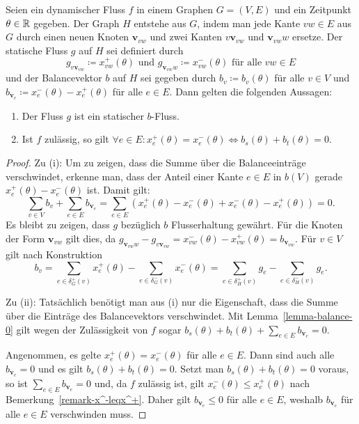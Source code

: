 \newcommand{\newv}{\mathbf{v}}
\begin{lemma}\label{lemma-b-graph}
	Seien ein dynamischer Fluss $f$ in einem Graphen $G=(V,E)$ und ein Zeitpunkt $\theta\in\mathbb{R}$ gegeben.
	Der Graph $H$ entstehe aus $G$, indem man jede Kante $vw\in E$ aus $G$ durch einen neuen Knoten $\newv_{vw}$ und zwei Kanten $v\newv_{vw}$ und $\newv_{vw}w$ ersetze.
	Der statische Fluss $g$ auf $H$ sei definiert durch
	\[ g_{v\newv_{vw}} \coloneq x_{vw}^+(\theta) \text{ und } g_{\newv_{vw}w} \coloneq x_{vw}^-(\theta) \text{ für alle $vw\in E$} \]
	und der Balancevektor $b$ auf $H$ sei gegeben durch $b_v\coloneq b_v(\theta)$ für alle $v\in V$ und $b_{\newv_e}\coloneq x_e^-(\theta) - x_e^+(\theta)$ für alle $e\in E$.
	Dann gelten die folgenden Aussagen:
	
	\begin{enumerate}[label=(\roman*)]
		\item Der Fluss $g$ ist ein statischer $b$-Fluss.
		\item\label{lemma-b-graph-imp} Ist $f$ zulässig, so gilt $\forall e\in E : x_e^+(\theta) = x_e^-(\theta)\iff b_s(\theta) + b_t(\theta) = 0$.
	\end{enumerate}
\end{lemma} 
\begin{proof}
	Zu (i): Um zu zeigen, dass die Summe über die Balanceeinträge verschwindet, erkenne man, dass der Anteil einer Kante $e\in E$ in $b(V)$ gerade $x_e^+(\theta) - x_e^-(\theta)$ ist.
	Damit gilt:
		\[ \sum_{v\in V}b_v + \sum_{e\in E} b_{\newv_e} = \sum_{e\in E} (x_e^+(\theta) - x_e^-(\theta) + x_e^-(\theta) - x_e^+(\theta)) = 0. \]
		Es bleibt zu zeigen, dass $g$ bezüglich $b$ Flusserhaltung gewährt.
		Für die Knoten der Form $\newv_{vw}$ gilt dies, da $g_{\newv_{vw}w} - g_{v\newv_{vw}} = x_{vw}^-(\theta) - x_{vw}^+(\theta) = b_{\newv_{vw}}$.
		Für $v\in V$ gilt nach Konstruktion
		\[ b_v =
		\sum_{e\in\delta^+_G(v)} x_{e}^+(\theta) - \sum_{e\in\delta^-_G(v)} x_{e}^-(\theta) =
	\sum_{e\in\delta_H^+(v)} g_e - \sum_{e\in\delta^-_H(v)}g_e
		. \]
	
	Zu (ii): Tatsächlich benötigt man aus (i) nur die Eigenschaft, dass die Summe über die Einträge des Balancevektors verschwindet.
	Mit Lemma~\ref{lemma-balance-0} gilt wegen der Zulässigkeit von $f$ sogar $b_s(\theta)+b_t(\theta) + \sum_{e\in E} b_{\newv_e} = 0$.
	
	Angenommen, es gelte $x_e^+(\theta) = x_e^-(\theta)$ für alle $e\in E$.
	Dann sind auch alle $b_{\newv_e} = 0$ und es gilt $b_s(\theta) + b_t(\theta) = 0$.
	Setzt man $b_s(\theta) + b_t(\theta) = 0$ voraus, so ist $\sum_{e\in E} b_{\newv_e} = 0$ und, da $f$ zulässig ist, gilt $x_e^-(\theta)\leq x_e^+(\theta)$ nach Bemerkung~\ref{remark-x^-leqx^+}.
	Daher gilt $b_{\newv_e}\leq 0$ für alle $e\in E$, weshalb $b_{\newv_e}$ für alle $e\in E$ verschwinden muss.
\end{proof}

